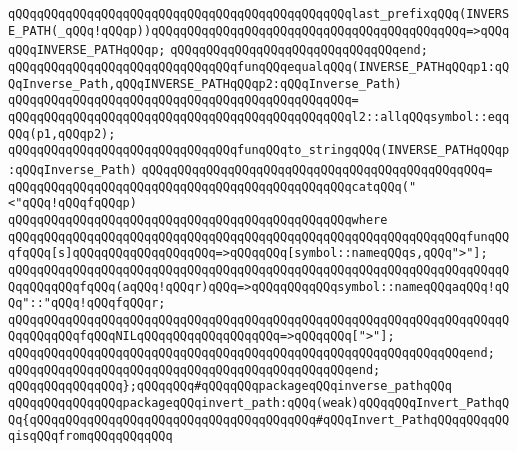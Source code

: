 \verb|qQQqqQQqqQQqqQQqqQQqqQQqqQQqqQQqqQQqqQQqqQQqqQQqlast_prefixqQQq(INVERSE_PATH(_qQQq!qQQqp))qQQqqQQqqQQqqQQqqQQqqQQqqQQqqQQqqQQqqQQqqQQq=>qQQqqQQqINVERSE_PATHqQQqp;|\newline
\verb|qQQqqQQqqQQqqQQqqQQqqQQqqQQqqQQqend;|\newline
\newline
\verb|qQQqqQQqqQQqqQQqqQQqqQQqqQQqqQQqfunqQQqequalqQQq(INVERSE_PATHqQQqp1:qQQqInverse_Path,qQQqINVERSE_PATHqQQqp2:qQQqInverse_Path)|\newline
\verb|qQQqqQQqqQQqqQQqqQQqqQQqqQQqqQQqqQQqqQQqqQQqqQQq=|\newline
\verb|qQQqqQQqqQQqqQQqqQQqqQQqqQQqqQQqqQQqqQQqqQQqqQQql2::allqQQqsymbol::eqqQQq(p1,qQQqp2);|\newline
\newline
\verb|qQQqqQQqqQQqqQQqqQQqqQQqqQQqqQQqfunqQQqto_stringqQQq(INVERSE_PATHqQQqp:qQQqInverse_Path)|\newline
\verb|qQQqqQQqqQQqqQQqqQQqqQQqqQQqqQQqqQQqqQQqqQQqqQQq=|\newline
\verb|qQQqqQQqqQQqqQQqqQQqqQQqqQQqqQQqqQQqqQQqqQQqqQQqcatqQQq("<"qQQq!qQQqfqQQqp)|\newline
\verb|qQQqqQQqqQQqqQQqqQQqqQQqqQQqqQQqqQQqqQQqqQQqqQQqwhere|\newline
\verb|qQQqqQQqqQQqqQQqqQQqqQQqqQQqqQQqqQQqqQQqqQQqqQQqqQQqqQQqqQQqqQQqfunqQQqfqQQq[s]qQQqqQQqqQQqqQQqqQQq=>qQQqqQQq[symbol::nameqQQqs,qQQq">"];|\newline
\verb|qQQqqQQqqQQqqQQqqQQqqQQqqQQqqQQqqQQqqQQqqQQqqQQqqQQqqQQqqQQqqQQqqQQqqQQqqQQqqQQqfqQQq(aqQQq!qQQqr)qQQq=>qQQqqQQqqQQqsymbol::nameqQQqaqQQq!qQQq"::"qQQq!qQQqfqQQqr;|\newline
\verb|qQQqqQQqqQQqqQQqqQQqqQQqqQQqqQQqqQQqqQQqqQQqqQQqqQQqqQQqqQQqqQQqqQQqqQQqqQQqqQQqfqQQqNILqQQqqQQqqQQqqQQqqQQq=>qQQqqQQq[">"];|\newline
\verb|qQQqqQQqqQQqqQQqqQQqqQQqqQQqqQQqqQQqqQQqqQQqqQQqqQQqqQQqqQQqqQQqend;|\newline
\verb|qQQqqQQqqQQqqQQqqQQqqQQqqQQqqQQqqQQqqQQqqQQqqQQqend;|\newline
\newline
\verb|qQQqqQQqqQQqqQQq};qQQqqQQq#qQQqqQQqpackageqQQqinverse_pathqQQq|\newline
\newline
\newline
\verb|qQQqqQQqqQQqqQQqpackageqQQqinvert_path:qQQq(weak)qQQqqQQqInvert_PathqQQq{qQQqqQQqqQQqqQQqqQQqqQQqqQQqqQQqqQQqqQQq#qQQqInvert_PathqQQqqQQqqQQqisqQQqfromqQQqqQQqqQQq|\newline
